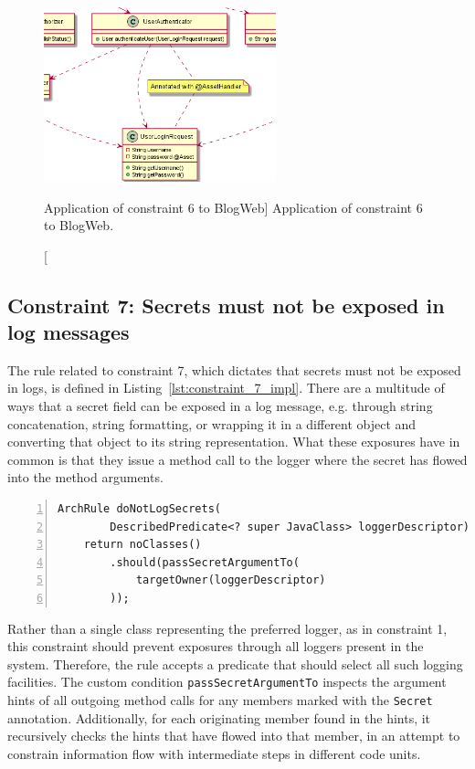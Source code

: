 \begin{figure}[ht]
    \centering
    \includegraphics[width=0.6\textwidth]{figure/toyexamples/Assets.png}
    \caption
        [Application of constraint 6 to BlogWeb]
        {Application of constraint 6 to BlogWeb.}
    \label{fig:assets_toy_system}
\end{figure}

\subsection{Constraint 7: Secrets must not be exposed in log messages}
The rule related to constraint 7, which dictates that secrets must not be exposed in logs, is defined in Listing~\ref{lst:constraint_7_impl}.
There are a multitude of ways that a secret field can be exposed in a log message, e.g. through string concatenation, string formatting, or wrapping it in a different object and converting that object to its string representation. What these exposures have in common is that they issue a method call to the logger where the secret has flowed into the method arguments.

\begin{minipage}{\linewidth}
\begin{lstlisting}[caption={Rule definition for constraint 7.}, captionpos=b, label=lst:constraint_7_impl, numbers=left]
ArchRule doNotLogSecrets(
        DescribedPredicate<? super JavaClass> loggerDescriptor) {
    return noClasses()
        .should(passSecretArgumentTo(
            targetOwner(loggerDescriptor)
        ));
\end{lstlisting}
\end{minipage}

Rather than a single class representing the preferred logger, as in constraint 1, this constraint should prevent exposures through all loggers present in the system. Therefore, the rule accepts a predicate that should select all such logging facilities. The custom condition \texttt{passSecretArgumentTo} inspects the argument hints of all outgoing method calls for any members marked with the \texttt{Secret} annotation. Additionally, for each originating member found in the hints, it recursively checks the hints that have flowed into that member, in an attempt to constrain information flow with intermediate steps in different code units.

